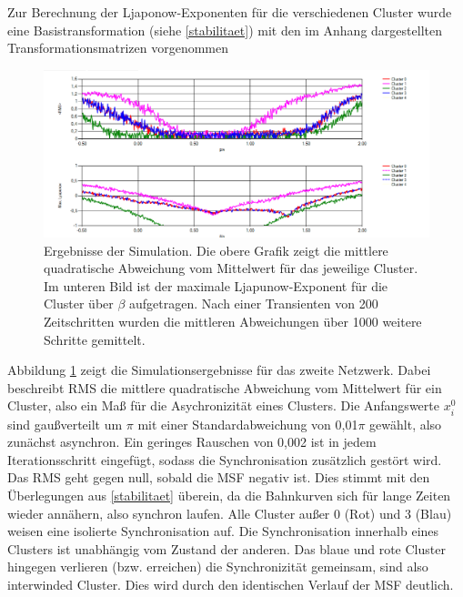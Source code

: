 Zur Berechnung der Ljaponow-Exponenten für die verschiedenen Cluster wurde eine Basistransformation (siehe \ref{stabilitaet}) mit den im Anhang dargestellten Transformationsmatrizen vorgenommen \cite{pecora2014,sagenotebook}
\begin{figure}
	\centering
	\includegraphics[width=1.0\textwidth]{abb/misc/ljapResult.png}
	\caption{Ergebnisse der Simulation. Die obere Grafik zeigt die mittlere quadratische Abweichung vom Mittelwert für das jeweilige Cluster. Im unteren Bild ist der maximale Ljapunow-Exponent für die Cluster über $\beta$ aufgetragen. Nach einer Transienten von 200 Zeitschritten wurden die mittleren Abweichungen über 1000 weitere Schritte gemittelt.}
	\label{fig:ljapResult}
\end{figure}
Abbildung \ref{fig:ljapResult} zeigt die Simulationsergebnisse für das zweite Netzwerk. Dabei beschreibt RMS die mittlere quadratische Abweichung vom Mittelwert für ein Cluster, also ein Maß für die Asychronizität eines Clusters. Die Anfangswerte $x_i^0$ sind gaußverteilt um $\pi$ mit einer Standardabweichung von 0,01$\pi$ gewählt, also zunächst asynchron. Ein geringes Rauschen von 0,002 ist in jedem Iterationsschritt eingefügt, sodass die Synchronisation zusätzlich gestört wird.
Das RMS geht gegen null, sobald die MSF negativ ist. Dies stimmt mit den Überlegungen aus \ref{stabilitaet} überein, da die Bahnkurven sich für lange Zeiten wieder annähern, also synchron laufen.
Alle Cluster außer 0 (Rot) und 3 (Blau) weisen eine isolierte Synchronisation auf. Die Synchronisation innerhalb eines Clusters ist unabhängig vom Zustand der anderen. Das blaue und rote Cluster hingegen verlieren (bzw. erreichen) die Synchronizität gemeinsam, sind also interwinded Cluster. Dies wird durch den identischen Verlauf der MSF deutlich.


